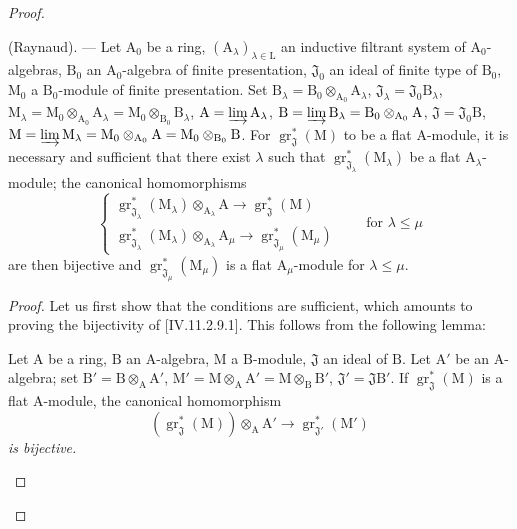 \begin{proof}
\begin{theorem}[11.2.9]
\label{IV.11.2.9}
(Raynaud). --- Let $\mathrm{A}_0$ be a ring, $(\mathrm{A}_\lambda)_{\lambda\in\mathrm{L}}$ an inductive filtrant system of $\mathrm{A}_0$-algebras, $\mathrm{B}_0$ an $\mathrm{A}_0$-algebra of finite presentation, $\mathfrak{J}_0$ an ideal of finite type of $\mathrm{B}_0$, $\mathrm{M}_0$ a $\mathrm{B}_0$-module of finite presentation. Set $\mathrm{B}_\lambda=\mathrm{B}_0\otimes_{\mathrm{A}_0}\mathrm{A}_\lambda$, $\mathfrak{J}_\lambda=\mathfrak{J}_0\mathrm{B}_\lambda$, $\mathrm{M}_\lambda=\mathrm{M}_0\otimes_{\mathrm{A}_0}\mathrm{A}_\lambda=\mathrm{M}_0\otimes_{\mathrm{B}_0}\mathrm{B}_\lambda$, $\mathrm{A}=\varinjlim\mathrm{A}_\lambda$, $\mathrm{B}=\varinjlim\mathrm{B}_\lambda=\mathrm{B}_0\otimes_{\mathrm{A}_0}\mathrm{A}$, $\mathfrak{J}=\mathfrak{J}_0\mathrm{B}$, $\mathrm{M}=\varinjlim\mathrm{M}_\lambda=\mathrm{M}_0\otimes_{\mathrm{A}_0}\mathrm{A}=\mathrm{M}_0\otimes_{\mathrm{B}_0}\mathrm{B}$. For $\operatorname{gr}^*_\mathfrak{J}(\mathrm{M})$ to be a flat $\mathrm{A}$-module, it is necessary and sufficient that there exist $\lambda$ such that $\operatorname{gr}^*_{\mathfrak{J}_\lambda}(\mathrm{M}_\lambda)$ be a flat $\mathrm{A}_\lambda$-module; the canonical homomorphisms
\begin{equation}
  \begin{cases}
    \operatorname{gr}^*_{\mathfrak{J}_\lambda}(\mathrm{M}_\lambda)\otimes_{\mathrm{A}_\lambda}\mathrm{A} \to \operatorname{gr}^*_\mathfrak{J}(\mathrm{M}) \\
    \operatorname{gr}^*_{\mathfrak{J}_\lambda}(\mathrm{M}_\lambda)\otimes_{\mathrm{A}_\lambda}\mathrm{A}_\mu \to \operatorname{gr}^*_{\mathfrak{J}_\mu}(\mathrm{M}_\mu)
  \end{cases}
  \qquad\text{for }\lambda\leqslant\mu
  \tag{11.2.9.1}
\end{equation}
are then bijective and $\operatorname{gr}^*_{\mathfrak{J}_\mu}(\mathrm{M}_\mu)$ is a flat $\mathrm{A}_\mu$-module for $\lambda\leqslant\mu$.
\end{theorem}

\begin{proof}
Let us first show that the conditions are sufficient, which amounts to proving the bijectivity of [IV.11.2.9.1]. This follows from the following lemma:

\begin{lemma}[11.2.9.2]
\label{IV.11.2.9.2}
Let $\mathrm{A}$ be a ring, $\mathrm{B}$ an $\mathrm{A}$-algebra, $\mathrm{M}$ a $\mathrm{B}$-module, $\mathfrak{J}$ an ideal of $\mathrm{B}$. Let $\mathrm{A}'$ be an $\mathrm{A}$-algebra; set $\mathrm{B}'=\mathrm{B}\otimes_\mathrm{A}\mathrm{A}'$, $\mathrm{M}'=\mathrm{M}\otimes_\mathrm{A}\mathrm{A}'=\mathrm{M}\otimes_\mathrm{B}\mathrm{B}'$, $\mathfrak{J}'=\mathfrak{J}\mathrm{B}'$. If $\operatorname{gr}^*_\mathfrak{J}(\mathrm{M})$ is a flat $\mathrm{A}$-module, the canonical homomorphism
\[
  (\operatorname{gr}^*_\mathfrak{J}(\mathrm{M}))\otimes_\mathrm{A}\mathrm{A}'\to\operatorname{gr}^*_{\mathfrak{J}'}(\mathrm{M}')
\]
\emph{is bijective.}
\end{lemma}


\end{proof}
\end{proof}
